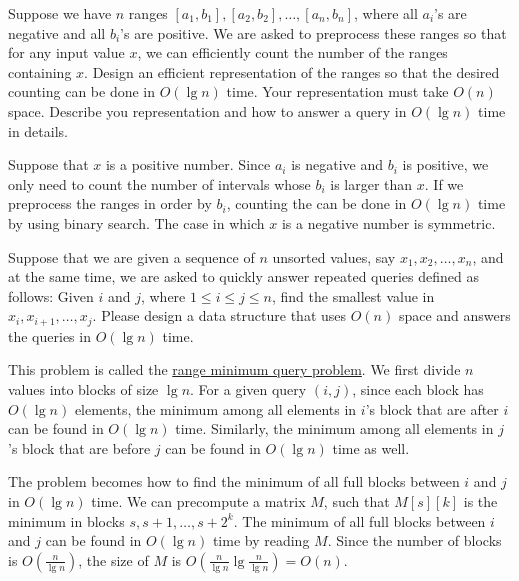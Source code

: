 \begin{Exercise}[origin={NTHU CSIE 100}]
Suppose we have $n$ ranges $[a_1, b_1], [a_2, b_2], \dots, [a_n, b_n]$, where all $a_i$'s are negative and all $b_i$'s are positive. We are asked to preprocess these ranges so that for any input value $x$, we can efficiently count the number of the ranges containing $x$. Design an efficient representation of the ranges so that the desired counting can be done in $O(\lg n)$ time. Your representation must take $O(n)$ space. Describe you representation and how to answer a query in $O(\lg n)$ time in details.
\end{Exercise}
\begin{Answer}
Suppose that $x$ is a positive number. Since $a_i$ is negative and $b_i$ is positive, we only need to count the number of intervals whose $b_i$ is larger than $x$. If we preprocess the ranges in order by $b_i$, counting the can be done in $O(\lg n)$ time by using binary search. The case in which $x$ is a negative number is symmetric.
\end{Answer}

\begin{Exercise}[title={Range minimum query problem},origin={NCTU BIOINFO 100},difficulty=1]
Suppose that we are given a sequence of $n$ unsorted values, say $x_1, x_2, \dots, x_n$, and at the same time, we are asked to quickly answer repeated queries defined as follows: Given $i$ and $j$, where $1 \leq i \leq j \leq n$, find the smallest value in $x_i, x_{i+1}, \dots, x_j$. Please design a data structure that uses $O(n)$ space and answers the queries in $O(\lg n)$ time.
\end{Exercise}
\begin{Answer}
This problem is called the \href{https://en.wikipedia.org/wiki/Range_minimum_query}{range minimum query problem}. 
We first divide $n$ values into blocks of size $\lg n$.
For a given query $(i, j)$, since each block has $O(\lg n)$ elements, the minimum among all elements in $i$'s block that are after $i$ can be found in $O(\lg n)$ time.
Similarly, the minimum among all elements in $j$'s block that are before $j$ can be found in $O(\lg n)$ time as well.

The problem becomes how to find the minimum of all full blocks between $i$ and $j$ in $O(\lg n)$ time.
We can precompute a matrix $M$, such that $M[s][k]$ is the minimum in blocks $s, s + 1, \dots, s + 2^k$.
The minimum of all full blocks between $i$ and $j$ can be found in $O(\lg n)$ time by reading $M$.
Since the number of blocks is $O(\frac{n}{\lg n})$, the size of $M$ is $O(\frac{n}{\lg n} \lg \frac{n}{\lg n}) = O(n)$.
\end{Answer}

\printbibliography[heading=subbibliography]
